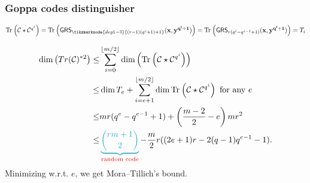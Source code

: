 \documentclass[
10pt, %
%
aspectratio=169, %
]{beamer}
\theoremstyle{plain}%
\theoremstyle{definition}
\theoremstyle{remark}
\newcommand{\calC}{\mathcal{C}}
\newcommand{\Tr}[1]{\operatorname{Tr}_{}\left(#1\right)}
\newcommand{\GRS}{\operatorname{\mathsf{GRS}}}
\begin{document}
\begin{frame}
	\frametitle{Goppa codes distinguisher \cite{MT21}}
	
	$\Tr{\calC\star \calC^{q^i}}=\Tr{\GRS_{\tikzmarknode{deg1-3}{(r-1)(q^i+1)+1}}(\mathbf{x},\mathbf{y^{q^i+1}})}= \Tr{\GRS_{r(q^i -q^{i-1}+1)}(\mathbf{x},\mathbf{y^{q^i+1}})} = T_i$
	
	\vspace{-0.9em}
\begin{align*}
	\dim\left( Tr(\calC)^{*2}\right) \leq& \sum\limits_{i=0}^{\lfloor{m/2} \rfloor} \dim \left( \Tr{\calC\star \calC^{q^i}}\right)\\
									\leq& \dim T_e+ \sum\limits_{i=e+1}^{\lfloor{m/2} \rfloor} \dim\Tr{\calC\star \calC^{q^i}} \text{ for any } e\\
	\leq& mr(q^e -q^{e-1}+1) + \left( \frac{m-2}{2}-e\right) mr^2\\
	\leq& \mathcolor{ballblue}{\underbrace{\binom{rm+1}{2}}}_{\text{\textcolor{red}{random code}}}  - \frac{m}{2}r((2e+1)r - 2(q-1)q^{e-1}-1).
\end{align*}
Minimizing w.r.t. $e$, we get Mora--Tillich's bound.

\end{frame}
\end{document}
